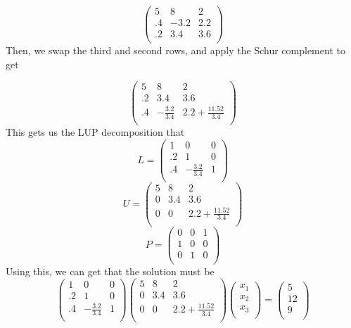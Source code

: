 \documentclass{article}
\begin{document}
 \[
 \left(\begin{array}{ccc}
 5&8&2\\
 .4&-3.2&2.2\\
 .2&3.4&3.6\\
 \end{array}\right)
 \]
 Then, we swap the third and second rows, and apply the Schur complement to get
 
 \[
 \left(\begin{array}{ccc}
 5&8&2\\
 .2&3.4&3.6\\
 .4&-\frac{3.2}{3.4}&2.2 +\frac{11.52}{3.4}\\
 \end{array}\right) 
 \]
This gets us the LUP decomposition that 
\[
L =  \left(\begin{array}{ccc}
 1&0&0\\
 .2&1&0\\
 .4&-\frac{3.2}{3.4}&1\\
 \end{array}\right) 
\]
\[
U =  \left(\begin{array}{ccc}
 5&8&2\\
 0&3.4&3.6\\
 0&0&2.2 +\frac{11.52}{3.4}\\
 \end{array}\right) 
\]
\[
P =  \left(\begin{array}{ccc}
 0&0&1\\
 1&0&0\\
 0&1&0\\
 \end{array}\right) 
\]
Using this, we can get that the solution must be
\[
\left(\begin{array}{ccc}
 1&0&0\\
 .2&1&0\\
 .4&-\frac{3.2}{3.4}&1\\
 \end{array}\right) 
 \left(\begin{array}{ccc}
 5&8&2\\
 0&3.4&3.6\\
 0&0&2.2 +\frac{11.52}{3.4}\\
 \end{array}\right) 
  \left(\begin{array}{c}
 x_1\\
 x_2\\
 x_3\\
 \end{array}\right) 
=
  \left(\begin{array}{c}
 5\\
 12\\
 9\\
 \end{array}\right) 
\]
\end{document}
